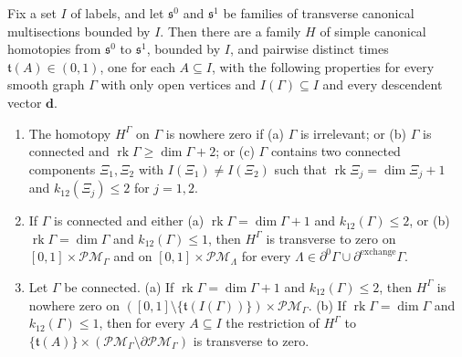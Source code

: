 \begin{importedthm}
Fix a set $I$ of labels, and let $\mathfrak s^0$ and $\mathfrak s^1$ be
families of transverse canonical multisections bounded by $I$.  Then there
are a family $H$ of simple canonical homotopies from $\mathfrak s^0$ to
$\mathfrak s^1$, bounded by $I$, and pairwise distinct times
$\mathfrak t(A)\in(0,1)$, one for each $A\subseteq I$, with the following
properties for every smooth graph $\Gamma$ with only open vertices and
$I(\Gamma)\subseteq I$ and every descendent vector $\mathbf d$.
\begin{enumerate}
\item The homotopy $H^\Gamma$ on $\Gamma$ is nowhere zero if (a) $\Gamma$ is
irrelevant; or (b) $\Gamma$ is connected and
$\operatorname{rk}\Gamma\geq\dim\Gamma+2$; or (c) $\Gamma$ contains two connected
components $\Xi_1,\Xi_2$ with $I(\Xi_1)\neq I(\Xi_2)$ such that
$\operatorname{rk}\Xi_j=\dim\Xi_j+1$ and $k_{12}(\Xi_j)\leq2$ for $j=1,2$.
\item If $\Gamma$ is connected and either (a)
$\operatorname{rk}\Gamma=\dim\Gamma+1$ and $k_{12}(\Gamma)\leq2$, or (b)
$\operatorname{rk}\Gamma=\dim\Gamma$ and $k_{12}(\Gamma)\leq1$, then
$H^\Gamma$ is transverse to zero on $[0,1]\times\mathcal{PM}_\Gamma$ and on
$[0,1]\times\mathcal{PM}_\Lambda$ for every
$\Lambda\in\partial^0\Gamma\cup\partial^{\mathrm{exchange}}\Gamma$.
\item Let $\Gamma$ be connected.  (a) If
$\operatorname{rk}\Gamma=\dim\Gamma+1$ and $k_{12}(\Gamma)\leq2$, then
$H^\Gamma$ is nowhere zero on
$([0,1]\setminus\{\mathfrak t(I(\Gamma))\})\times\mathcal{PM}_\Gamma$.  (b)
If $\operatorname{rk}\Gamma=\dim\Gamma$ and $k_{12}(\Gamma)\leq1$, then for
every $A\subseteq I$ the restriction of $H^\Gamma$ to
$\{\mathfrak t(A)\}\times(\mathcal{PM}_\Gamma\setminus\partial\mathcal{PM}_\Gamma)$
is transverse to zero.
\end{enumerate}
\end{importedthm}

